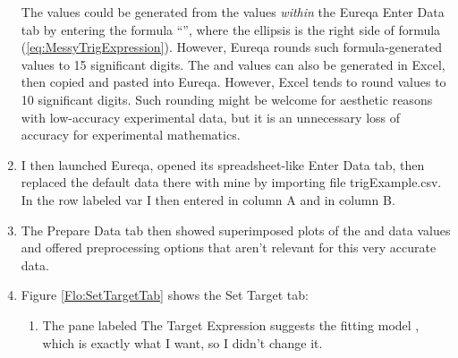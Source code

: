 \documentclass[12pt,english]{article}
\begin{document}
\begin{enumerate}
{The  values could be generated from the  values \textsl{within}
the Eureqa \textsf{Enter Data} tab by entering the formula {}``'',
where the ellipsis is the right side of formula (\ref{eq:MessyTrigExpression}).
However, Eureqa rounds such formula-generated values to 15 significant
digits. The  and  values can also be generated in Excel, then
copied and pasted into Eureqa. However, Excel tends to round values
to 10 significant digits. Such rounding might be welcome for aesthetic
reasons with low-accuracy experimental data, but it is an unnecessary
loss of accuracy for experimental mathematics.}\vspace{-5pt}

\item I then launched Eureqa, opened its spreadsheet-like \textsf{Enter
Data} tab, then replaced the default data there with mine by importing
file trigExample.csv. In the row labeled \textsf{var} I then entered
 in column A and  in column B.\vspace{-5pt}

\item The \textsf{Prepare Data} tab then showed superimposed plots of the
 and  data values and offered preprocessing options that aren't
relevant for this very accurate data.\vspace{-5pt}

\item Figure \ref{Flo:SetTargetTab} shows the \textsf{Set Target} tab:\vspace{-5pt}


\begin{enumerate}
\item The pane labeled \textsf{The Target Expression} suggests the fitting
model , which is exactly what I want, so I didn't change
it.\vspace{-3pt}


\end{enumerate}
\end{enumerate}
\end{document}
